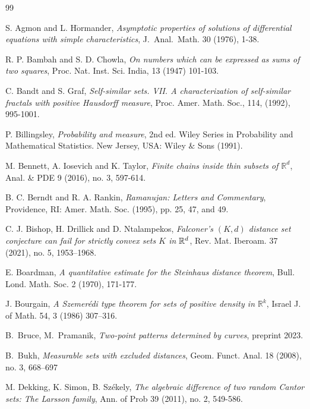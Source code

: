 \documentclass[a4paper,11pt]{amsart}
\numberwithin{equation}{section}
\begin{document}
\begin{thebibliography}{99}

  S. Agmon and L. H$\ddot{\text{o}}$rmander, \textit{Asymptotic properties of solutions of differential equations
with simple characteristics}, J.~Anal.~Math. 30 (1976), 1-38.

 R. P. Bambah and S. D. Chowla, \textit{On numbers which can be expressed as sums of two squares}, Proc. Nat. Inst. Sci. India, 13 (1947) 101-103.

 C. Bandt and S. Graf, \textit{Self-similar sets. VII. A characterization of self-similar fractals with
positive Hausdorff measure}, Proc. Amer. Math. Soc., 114, (1992), 995-1001.

 P. Billingsley, \textit{Probability and measure}, 2nd ed. Wiley Series in Probability and Mathematical Statistics. New Jersey, USA: Wiley $\&$ Sons (1991).

 M. Bennett, A. Iosevich and K. Taylor, {\textit{Finite chains inside thin subsets of $\mathbb R^d$}}, Anal. \& PDE
9 (2016), no. 3, 597-614.

 B. C. Berndt and R. A. Rankin,  {\em{Ramanujan: Letters and Commentary}}, Providence, RI: Amer. Math. Soc. (1995), pp. 25, 47, and 49.

 C. J. Bishop, H. Drillick and D. Ntalampekos, {\em{Falconer's $(K,d)$ distance set conjecture can fail for strictly convex sets $K$ in $\Bbb R^d$}}, Rev. Mat. Iberoam. 37 (2021), no. 5, 1953–1968. 

 E. Boardman, {\em{A quantitative estimate for the Steinhaus distance theorem}}, Bull. Lond. Math. Soc. 2 (1970), 171-177. 

 J. Bourgain, \textit{A Szemer{\'e}di type theorem for sets of positive density in $\mathbb R^k$}, Israel J. of Math. 54, 3 (1986) 307--316.

 B.~Bruce, M.~Pramanik, \textit{Two-point patterns determined by curves}, preprint 2023. 

 B.~Bukh, \textit{Measurable sets with excluded distances}, Geom. Funct. Anal. 18 (2008), no. 3, 668–697

 M. Dekking, K. Simon, B. Sz\'ekely, \textit{The algebraic difference of two random Cantor sets: The Larsson family}, Ann. of Prob 39 (2011), no. 2, 549-586.   


\end{thebibliography}
\end{document}

